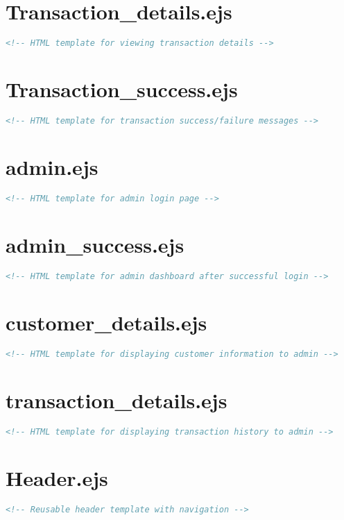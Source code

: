 \documentclass{report}
\begin{document}
\section{Transaction\_details.ejs}
\begin{lstlisting}[language=HTML]
<!-- HTML template for viewing transaction details -->
\end{lstlisting}

\section{Transaction\_success.ejs}
\begin{lstlisting}[language=HTML]
<!-- HTML template for transaction success/failure messages -->
\end{lstlisting}

\section{admin.ejs}
\begin{lstlisting}[language=HTML]
<!-- HTML template for admin login page -->
\end{lstlisting}

\section{admin\_success.ejs}
\begin{lstlisting}[language=HTML]
<!-- HTML template for admin dashboard after successful login -->
\end{lstlisting}

\section{customer\_details.ejs}
\begin{lstlisting}[language=HTML]
<!-- HTML template for displaying customer information to admin -->
\end{lstlisting}

\section{transaction\_details.ejs}
\begin{lstlisting}[language=HTML]
<!-- HTML template for displaying transaction history to admin -->
\end{lstlisting}

\section{Header.ejs}
\begin{lstlisting}[language=HTML]
<!-- Reusable header template with navigation -->
\end{lstlisting}
\end{document}
